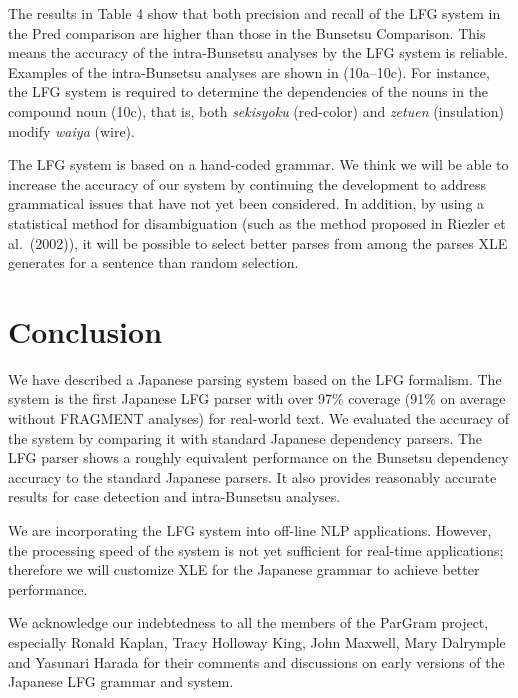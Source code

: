 \documentclass[english]{jnlp_1.4_rep}
\begin{document}
The results in Table 4 show that both precision and recall of the LFG
system in the Pred comparison are higher than those in the Bunsetsu
Comparison.  This means the accuracy of the intra-Bunsetsu analyses by
the LFG system is reliable.  Examples of the intra-Bunsetsu analyses
are shown in (10a--10c).  For instance, the LFG system is
required to determine the dependencies of the nouns in the compound
noun (10c), that is, both \textit{sekisyoku} (red-color) and
\textit{zetuen} (insulation) modify \textit{waiya} (wire).

The LFG system is based on a hand-coded grammar.  We think we will be
able to increase the accuracy of our system by continuing the
development to address grammatical issues that have not yet been
considered.  In addition, by using a statistical method for
disambiguation (such as the method proposed in Riezler et al.\ (2002)),
it will be possible to select better parses from among the parses XLE
generates for a sentence than random selection.


\section{Conclusion} 

We have described a Japanese parsing system based on the LFG
formalism.  The system is the first Japanese LFG parser with over 97\%
coverage (91\% on average without FRAGMENT analyses) for real-world
text.  We evaluated the accuracy of the system by comparing it with
standard Japanese dependency parsers.  The LFG parser shows a roughly
equivalent performance on the Bunsetsu dependency accuracy to the
standard Japanese parsers.  It also provides reasonably accurate
results for case detection and intra-Bunsetsu analyses.

We are incorporating the LFG system into off-line NLP applications.
However, the processing speed of the system is not yet sufficient for
real-time applications; therefore we will customize XLE for the
Japanese grammar to achieve better performance.



\acknowledgment

We acknowledge our indebtedness to all the members of the ParGram
project, especially Ronald Kaplan, Tracy Holloway King, John Maxwell,
Mary Dalrymple and Yasunari Harada for their comments and discussions
on early versions of the Japanese LFG grammar and system.



\end{document}
